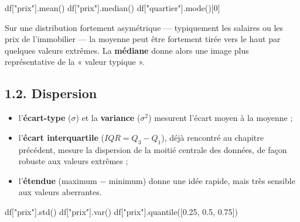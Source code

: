 \documentclass[
  french,
  letterpaper,
  open=any]{scrbook}
\newenvironment{Shaded}{\begin{snugshade}}{\end{snugshade}}
\newcommand{\DecValTok}[1]{\textcolor[rgb]{0.68,0.00,0.00}{#1}}
\newcommand{\FloatTok}[1]{\textcolor[rgb]{0.68,0.00,0.00}{#1}}
\newcommand{\NormalTok}[1]{\textcolor[rgb]{0.00,0.23,0.31}{#1}}
\newcommand{\StringTok}[1]{\textcolor[rgb]{0.13,0.47,0.30}{#1}}
\providecommand{\tightlist}{%
  \setlength{\itemsep}{0pt}\setlength{\parskip}{0pt}}
\theoremstyle{definition}
\theoremstyle{definition}
\theoremstyle{remark}
\begin{document}
\begin{Shaded}
\begin{Highlighting}[]
\NormalTok{df[}\StringTok{"prix"}\NormalTok{].mean()}
\NormalTok{df[}\StringTok{"prix"}\NormalTok{].median()}
\NormalTok{df[}\StringTok{"quartier"}\NormalTok{].mode()[}\DecValTok{0}\NormalTok{]}
\end{Highlighting}
\end{Shaded}

\begin{tcolorbox}[enhanced jigsaw, arc=.35mm, bottomrule=.15mm, bottomtitle=1mm, breakable, colback=white, colbacktitle=quarto-callout-warning-color!10!white, colframe=quarto-callout-warning-color-frame, coltitle=black, left=2mm, leftrule=.75mm, opacityback=0, opacitybacktitle=0.6, rightrule=.15mm, title=\textcolor{quarto-callout-warning-color}{\faExclamationTriangle}\hspace{0.5em}{Moyenne ou médiane ?}, titlerule=0mm, toprule=.15mm, toptitle=1mm]

Sur une distribution fortement asymétrique --- typiquement les salaires
ou les prix de l'immobilier --- la moyenne peut être fortement tirée
vers le haut par quelques valeurs extrêmes. La \textbf{médiane} donne
alors une image plus représentative de la « valeur typique ».

\end{tcolorbox}

\subsection{1.2. Dispersion}\label{dispersion}

\begin{itemize}
\tightlist
\item
  l'\textbf{écart-type} (\(\sigma\)) et la \textbf{variance}
  (\(\sigma^2\)) mesurent l'écart moyen à la moyenne ;
\item
  l'\textbf{écart interquartile} (\(IQR = Q_3 - Q_1\)), déjà rencontré
  au chapitre précédent, mesure la dispersion de la moitié centrale des
  données, de façon robuste aux valeurs extrêmes ;
\item
  l'\textbf{étendue} (maximum − minimum) donne une idée rapide, mais
  très sensible aux valeurs aberrantes.
\end{itemize}

\begin{Shaded}
\begin{Highlighting}[]
\NormalTok{df[}\StringTok{"prix"}\NormalTok{].std()}
\NormalTok{df[}\StringTok{"prix"}\NormalTok{].var()}
\NormalTok{df[}\StringTok{"prix"}\NormalTok{].quantile([}\FloatTok{0.25}\NormalTok{, }\FloatTok{0.5}\NormalTok{, }\FloatTok{0.75}\NormalTok{])}
\end{Highlighting}
\end{Shaded}
\end{document}
